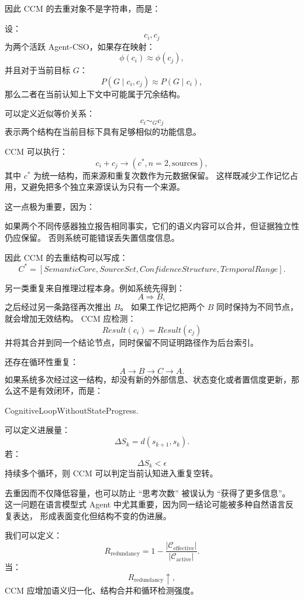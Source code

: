 因此 CCM 的去重对象不是字符串，而是：
\begin{statementbox}
\centering
{}
\end{statementbox}

设：
\[
c_i,
c_j
\]
为两个活跃 Agent-CSO，如果存在映射：
\[
\phi(c_i)\approx\phi(c_j),
\]
并且对于当前目标 $G$：
\[
P(G\mid c_i,c_j)
\approx
P(G\mid c_i),
\]
那么二者在当前认知上下文中可能属于冗余结构。

可以定义近似等价关系：
\[
c_i
\sim_G
c_j
\]
表示两个结构在当前目标下具有足够相似的功能信息。

CCM 可以执行：
\[
c_i+c_j
\longrightarrow
(c^*,n=2,\mathrm{sources}),
\]
其中 $c^*$ 为统一结构，而来源和重复次数作为元数据保留。
这样既减少工作记忆占用，又避免把多个独立来源误认为只有一个来源。

这一点极为重要，因为：
\begin{statementbox}
\centering
{}
\end{statementbox}
如果两个不同传感器独立报告相同事实，它们的语义内容可以合并，但证据独立性仍应保留。
否则系统可能错误丢失置信度信息。

因此 CCM 的去重结构可以写成：
\[
C^*
=
[
SemanticCore,
SourceSet,
ConfidenceStructure,
TemporalRange
].
\]

另一类重复来自推理过程本身。例如系统先得到：
\[
A\Rightarrow B,
\]
之后经过另一条路径再次推出 $B$。
如果工作记忆把两个 $B$ 同时保持为不同节点，就会增加无效结构。
CCM 应检测：
\[
Result(c_i)=Result(c_j)
\]
并将其合并到同一个结论节点，同时保留不同证明路径作为后台索引。

还存在循环性重复：
\[
A\to B\to C\to A.
\]
如果系统多次经过这一结构，却没有新的外部信息、状态变化或者置信度更新，那么这不是有效闭环，而是：
\begin{statementbox}
CognitiveLoopWithoutStateProgress.
\end{statementbox}
可以定义进展量：
\[
\Delta S_k
=
d(s_{k+1},s_k).
\]
若：
\[
\Delta S_k<\epsilon
\]
持续多个循环，则 CCM 可以判定当前认知进入重复空转。

去重因而不仅降低容量，也可以防止 ``思考次数'' 被误认为 ``获得了更多信息''。
这一问题在语言模型式 Agent 中尤其重要，因为同一结论可能被多种自然语言反复表达，
形成表面变化但结构不变的伪进展。

我们可以定义：
\[
R_{\mathrm{redundancy}}
=
1-
\frac{
|\mathcal C_{\mathrm{effective}}|
}{
|\mathcal C_{\mathrm{active}}|
}.
\]
当：
\[
R_{\mathrm{redundancy}}\uparrow,
\]
CCM 应增加语义归一化、结构合并和循环检测强度。

